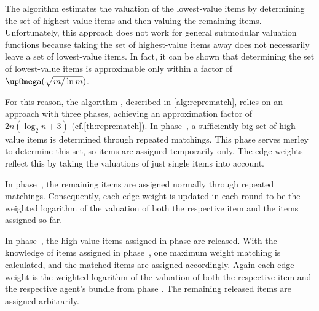The algorithm \SMatch{} estimates the valuation of the lowest-value items by determining the set of highest-value items and then valuing the remaining items.
Unfortunately, this approach does not work for general submodular valuation functions because taking the set of highest-value items away does not necessarily leave a set of lowest-value items.
In fact, it can be shown \cite{submodular_low_value} that determining the set of lowest-value items is approximable only within a factor of \(\bigomega(\sqrt{m / \ln m})\).

For this reason, the algorithm \RepReMatch, described in \cref{alg:reprematch}, relies on an approach with three phases, achieving an approximation factor of \(2n(\log_2 n + 3)\) (cf.\@ \cref{th:reprematch}).
In phase~\phasei, a sufficiently big set of high-value items is determined through repeated matchings.
This phase serves merley to determine this set, so items are assigned temporarily only.
The edge weights reflect this by taking the valuations of just single items into account.

In phase~\phaseii, the remaining items are assigned normally through repeated matchings.
Consequently, each edge weight is updated in each round to be the weighted logarithm of the valuation of both the respective item and the items assigned so far.

In phase~\phaseiii, the high-value items assigned in phase \phasei{} are released.
With the knowledge of items assigned in phase~\phaseii, one maximum weight matching is calculated, and the matched items are assigned accordingly.
Again each edge weight is the weighted logarithm of the valuation of both the respective item and the respective agent's bundle from phase \phaseii.
The remaining released items are assigned arbitrarily.

